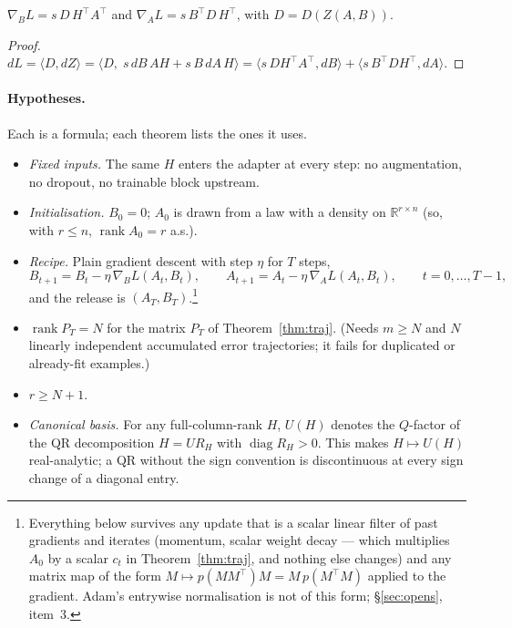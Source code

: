\begin{lemma}[gradients]\label{lem:grad}
$\nabla_B L=s\,D\,H^{\!\top}A^{\!\top}$ and $\nabla_A L=s\,B^{\!\top}D\,H^{\!\top}$,
with $D=D(Z(A,B))$.
\end{lemma}
\begin{proof}
$dL=\langle D,dZ\rangle=\langle D,\;s\,dB\,AH+s\,B\,dA\,H\rangle
 =\langle s\,D H^{\!\top}A^{\!\top},dB\rangle+\langle s\,B^{\!\top}DH^{\!\top},dA\rangle$.
\end{proof}

\paragraph{Hypotheses.} Each is a formula; each theorem lists the ones it uses.
\begin{itemize}\itemsep2pt
\item[(A1)] \emph{Fixed inputs.} The same $H$ enters the adapter at every
  step: no augmentation, no dropout, no trainable block upstream.
\item[(A2)] \emph{Initialisation.} $B_0=0$; $A_0$ is drawn from a law with a
  density on $\mathbb R^{r\times n}$ (so, with $r\le n$,
  $\operatorname{rank}A_0=r$ a.s.).
\item[(A3)] \emph{Recipe.} Plain gradient descent with step $\eta$ for $T$
  steps,
  \[
    B_{t+1}=B_t-\eta\,\nabla_BL(A_t,B_t),\qquad
    A_{t+1}=A_t-\eta\,\nabla_AL(A_t,B_t),\qquad t=0,\dots,T-1,
  \]
  and the release is $(A_T,B_T)$.\footnote{Everything below survives any
  update that is a scalar linear filter of past gradients and iterates
  (momentum, scalar weight decay — which multiplies $A_0$ by a scalar $c_t$
  in Theorem~\ref{thm:traj}, and nothing else changes) and any matrix map of
  the form $M\mapsto p(MM^{\!\top})M=M\,p(M^{\!\top}M)$ applied to the
  gradient. Adam's entrywise normalisation is not of this form; \S\ref{sec:opens}, item~3.}
\item[(A4)] $\operatorname{rank}P_T=N$ for the matrix $P_T$ of
  Theorem~\ref{thm:traj}. (Needs $m\ge N$ and $N$ linearly independent
  accumulated error trajectories; it fails for duplicated or already-fit
  examples.)
\item[(A5)] $r\ge N+1$.
\item[(A6)] \emph{Canonical basis.} For any full-column-rank $H$, $U(H)$
  denotes the $Q$-factor of the QR decomposition $H=UR_H$ with
  $\operatorname{diag}R_H>0$. This makes $H\mapsto U(H)$ real-analytic; a
  QR without the sign convention is discontinuous at every sign change of a
  diagonal entry.

\end{itemize}
